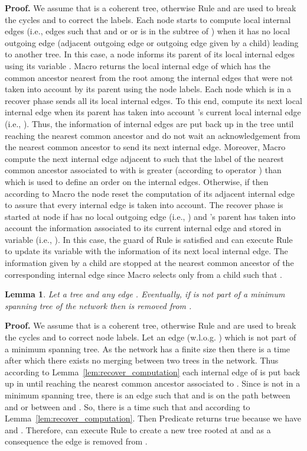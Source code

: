 \documentclass[11pt,a4paper]{article}
\newtheorem{lemma}{Lemma}
\newenvironment{proof}{\noindent \begin{rm}{\textbf{Proof.} }}{\hspace*{\fill}\par\end{rm}}
\begin{document}
\begin{proof}
We assume that  is a coherent tree, otherwise Rule  and  are used to break the cycles and to correct the labels. Each node  starts to compute local internal edges (i.e., edges  such that  and  or  or  is in the subtree of ) when it has no local outgoing edge (adjacent outgoing edge or outgoing edge given by a child) leading to another tree. In this case, a node  informs its parent of its local internal edges using its variable . Macro  returns the local internal edge of  which has the common ancestor nearest from the root among the internal edges that were not taken into account by its parent using the node labels. Each node  which is in a recover phase sends all its local internal edges. To this end,  compute its next local internal edge when its parent has taken into account 's current local internal edge (i.e., ). Thus, the information of internal edges are put back up in the tree until reaching the nearest common ancestor and  do not wait an acknowledgement from the nearest common ancestor to send its next internal edge. Moreover, Macro  compute the next internal edge adjacent to  such that the label of the nearest common ancestor associated to  with  is greater (according to operator ) than  which is used to define an order on the internal edges. Otherwise, if  then according to Macro  the node  reset the computation of its adjacent internal edge to assure that every internal edge is taken into account. The recover phase is started at node  if  has no local outgoing edge (i.e., ) and 's parent has taken into account the information associated to its current internal edge and stored in variable  (i.e., ). In this case, the guard of Rule  is satisfied and  can execute Rule  to update its variable  with the information of its next local internal edge. The information given by a child are stopped at the nearest common ancestor  of the corresponding internal edge since Macro  selects only  from a child  such that .
\end{proof}

\begin{lemma}
\label{lem:mst_correction}
Let  a tree and any edge . Eventually, if  is not part of a minimum spanning tree of the network then  is removed from .
\end{lemma}

\begin{proof}
We assume that  is a coherent tree, otherwise Rule  and  are used to break the cycles and to correct node labels. Let an edge  (w.l.o.g. ) which is not part of a minimum spanning tree. As the network has a finite size then there is a time after which there exists no merging between two trees in the network. Thus according to Lemma~\ref{lem:recover_computation} each internal edge  of  is put back up in  until reaching the nearest common ancestor associated to . Since  is not in a minimum spanning tree, there is an edge  such that  and  is on the path between  and  or between  and . So, there is a time such that  and  according to Lemma~\ref{lem:recover_computation}. Then Predicate  returns true because we have  and . Therefore,  can execute Rule  to create a new tree rooted at  and as a consequence the edge  is removed from .
\end{proof}
\end{document}
